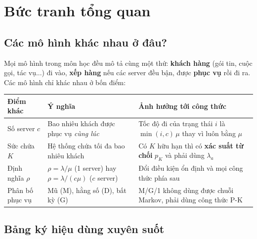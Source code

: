 \section{Bức tranh tổng quan}

\subsection{Các mô hình khác nhau ở đâu?}

Mọi mô hình trong môn học đều mô tả cùng một thứ: \textbf{khách hàng} (gói tin, cuộc gọi, tác vụ...) đi vào, \textbf{xếp hàng} nếu các server đều bận, được \textbf{phục vụ} rồi đi ra. Các mô hình chỉ khác nhau ở bốn điểm:

\begin{center}
\begin{tabularx}{\linewidth}{@{}l X X@{}}
\toprule
\textbf{Điểm khác} & \textbf{Ý nghĩa} & \textbf{Ảnh hưởng tới công thức} \\
\midrule
Số server $c$ & Bao nhiêu khách được phục vụ \emph{cùng lúc} & Tốc độ đi của trạng thái $i$ là $\min(i,c)\,\mu$ thay vì luôn bằng $\mu$ \\
Sức chứa $K$ & Hệ thống chứa tối đa bao nhiêu khách & Có $K$ hữu hạn thì có \textbf{xác suất từ chối} $p_K$ và phải dùng \textbf{$\lambda_a$} \\
Định nghĩa $\rho$ & $\rho = \lambda/\mu$ (1 server) hay $\rho=\lambda/(c\mu)$ ($c$ server) & Đổi điều kiện ổn định và mọi công thức phía sau \\
Phân bố phục vụ & Mũ (M), hằng số (D), bất kỳ (G) & M/G/1 không dùng được chuỗi Markov, phải dùng công thức P-K \\
\bottomrule
\end{tabularx}
\end{center}

\subsection{Bảng ký hiệu dùng xuyên suốt}

